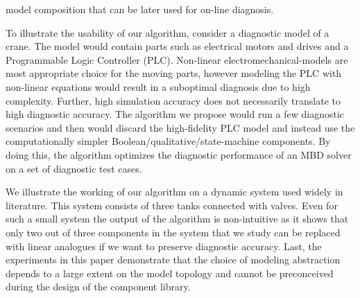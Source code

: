 model composition that can be later used for on-line diagnosis.
\par
To illustrate the usability of our algorithm, consider a diagnostic
model of a crane. The model would contain parts such as electrical
motors and drives and a Programmable Logic Controller
(PLC). Non-linear electromechanical-models are most appropriate choice
for the moving parts, however modeling the PLC with non-linear
equations would result in a suboptimal diagnosis due to high
complexity. Further, high simulation accuracy does not necessarily
translate to high diagnostic accuracy. The algorithm we propose would
run a few diagnostic scenarios and then would discard the
high-fidelity PLC model and instead use the computationally simpler
Boolean/qualitative/state-machine components. By doing this, the
algorithm optimizes the diagnostic performance of an MBD solver on a
set of diagnostic test cases.
\par
We illustrate the working of our algorithm on a dynamic system used
widely in literature. This system consists of three tanks connected
with valves. Even for such a small system the output of the algorithm
is non-intuitive as it shows that only two out of three components in
the system that we study can be replaced with linear analogues if we
want to preserve diagnostic accuracy. Last, the experiments in this
paper demonstrate that the choice of modeling abstraction depends to a
large extent on the model topology and cannot be preconceived during
the design of the component library.
